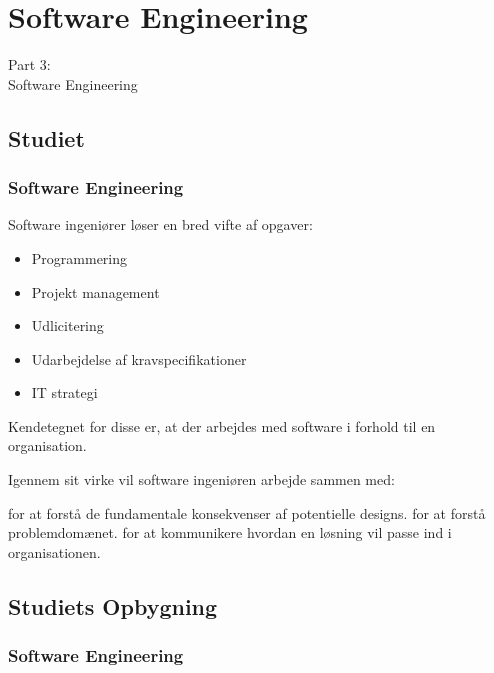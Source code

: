 {
\renewcommand{\bgcolor}{se}

\section{Software Engineering}
\begin{frame}
    \vspace{25mm}
    \begin{center}
        \Huge{Part 3:\\Software Engineering}
    \end{center}
\end{frame}

\subsection{Studiet}
\begin{frame}[fragile]
  \frametitle{Software Engineering }
  \vspace{1mm}
  Software ingeniører løser en bred vifte af opgaver:
  \begin{itemize}
    \item Programmering
    \item Projekt management
    \item Udlicitering
    \item Udarbejdelse af kravspecifikationer
    \item IT strategi
  \end{itemize}
  
  \pause
  \vspace{3mm}
  Kendetegnet for disse er, at der arbejdes med software i forhold til en organisation.
  
  \pause
  \vspace{3mm}
  Igennem sit virke vil software ingeniøren arbejde sammen med:
  \begin{itemize}
     for at forstå de fundamentale konsekvenser af potentielle designs.
     for at forstå problemdomænet.
     for at kommunikere hvordan en løsning vil passe ind i organisationen.
  \end{itemize}
\end{frame}

\subsection{Studiets Opbygning}
\begin{frame}[fragile]
  \frametitle{Software Engineering }
  \vspace{-2mm}
  

\end{frame}}
